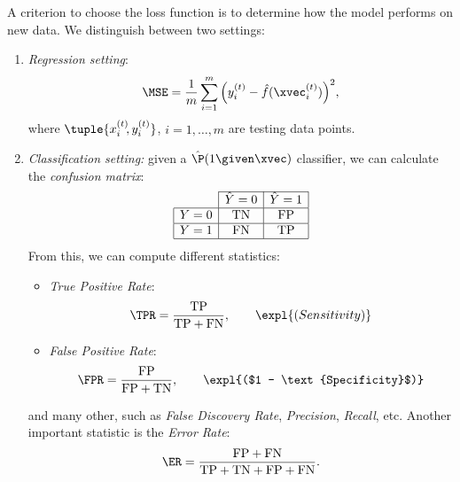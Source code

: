 A criterion to choose the loss function is to determine how the model performs on new data. We distinguish between two settings:
\begin{enumerate}
    \item \emph{Regression setting}:
          \begin{equation}
              \MSE = \frac{1}{m}\sum_{i=1}^m \left(y_i^{(t)} - \hat{f}(\xvec_i^{(t)})\right)^2\negthinspace,
          \end{equation}
          where $\tuple{x_i^{(t)}\negmedspace, y_i^{(t)}}$, $i=1,\dots,m$ are testing data points.

    \item \emph{Classification setting:} given a $\hat{\P}(1\given \xvec)$ classifier, we can calculate the \emph{confusion matrix}:
          \begin{equation}
              \begin{array}{|c|c|c|}
                  \cline{2-3}
                  \multicolumn{1}{c|}{} & \hat{Y} = 0 & \hat{Y} = 1 \\
                  \hline
                  Y = 0                 & \text{TN} & \text{FP} \\
                  \hline
                  Y = 1                 & \text{FN} & \text{TP} \\
                  \hline
              \end{array}
          \end{equation}
          From this, we can compute different statistics:
          \begin{itemize}
              \item \emph{True Positive Rate}: \begin{equation}
                        \TPR = \frac{\text{TP}}{\text{TP} + \text{FN}},\qquad\expl{(Sensitivity)}
                    \end{equation}
              \item \emph{False Positive Rate}: \begin{equation}
                        \FPR = \frac{\text{FP}}{\text{FP} + \text{TN}},\qquad\expl{($1 - \text{Specificity}$)}
                    \end{equation}
          \end{itemize}
          and many other, such as \emph{False Discovery Rate}, \emph{Precision}, \emph{Recall}, etc. Another important statistic is the \emph{Error Rate}:
          \begin{equation}
              \ER = \frac{\text{FP} + \text{FN}}{\text{TP} + \text{TN} + \text{FP} + \text{FN}}.
          \end{equation}
\end{enumerate}

